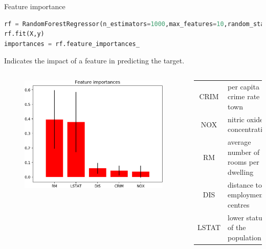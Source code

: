 \documentclass[handout]{beamer}
\begin{document}
\begin{frame}[fragile]{Feature importance}
\begin{lstlisting}[language=Python]
rf = RandomForestRegressor(n_estimators=1000,max_features=10,random_state=10)
rf.fit(X,y)
importances = rf.feature_importances_
\end{lstlisting}
\vspace{-1.5em}
Indicates the impact of a feature in predicting the target.
\begin{columns}
    \begin{figure}
        \centering
        \includegraphics[width=.9\textwidth]{fig/L2/importance_RF.png}
    \end{figure}
    \begin{table}
    \centering
    \footnotesize
    \begin{tabular}{c|p{4.5cm}}
       CRIM   &  per capita crime rate by town \\   
       NOX    &  nitric oxides concentration  \\
       RM     &  average number of rooms per dwelling \\
       DIS    &  distance to employment centres \\
       LSTAT  &  lower status of the population \\
         
        \end{tabular}
        \end{table}

\end{columns}
\end{frame}
\end{document}
